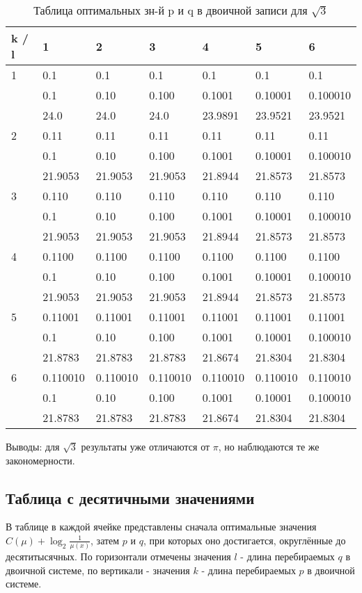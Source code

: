 \documentclass[12pt]{article}
\begin{document}
	\begin{table}[h]
		\caption{Таблица оптимальных зн-й p и q в двоичной записи для $\sqrt{3}$}
		\label{table:3Binary}
		\begin{center}
			\begin{tabular}{|l|l|l|l|l|l|l|}
				\hline
				k / l &1 & 2 & 3 & 4 & 5 & 6\\
				\hline
				1 & 0.1& 0.1& 0.1& 0.1& 0.1& 0.1\\
				& 0.1& 0.10& 0.100& 0.1001& 0.10001& 0.100010\\
				& 24.0& 24.0& 24.0& 23.9891& 23.9521& 23.9521\\
				\hline
				2 & 0.11& 0.11& 0.11& 0.11& 0.11& 0.11\\
				& 0.1& 0.10& 0.100& 0.1001& 0.10001& 0.100010\\
				& 21.9053& 21.9053& 21.9053& 21.8944& 21.8573& 21.8573\\
				\hline
				3 & 0.110& 0.110& 0.110& 0.110& 0.110& 0.110\\
				& 0.1& 0.10& 0.100& 0.1001& 0.10001& 0.100010\\
				& 21.9053& 21.9053& 21.9053& 21.8944& 21.8573& 21.8573\\
				\hline
				4 & 0.1100& 0.1100& 0.1100& 0.1100& 0.1100& 0.1100\\
				& 0.1& 0.10& 0.100& 0.1001& 0.10001& 0.100010\\
				& 21.9053& 21.9053& 21.9053& 21.8944& 21.8573& 21.8573\\
				\hline
				5 & 0.11001& 0.11001& 0.11001& 0.11001& 0.11001& 0.11001\\
				& 0.1& 0.10& 0.100& 0.1001& 0.10001& 0.100010\\
				& 21.8783& 21.8783& 21.8783& 21.8674& 21.8304& 21.8304\\
				\hline
				6 & 0.110010& 0.110010& 0.110010& 0.110010& 0.110010& 0.110010\\
				& 0.1& 0.10& 0.100& 0.1001& 0.10001& 0.100010\\
				& 21.8783& 21.8783& 21.8783& 21.8674& 21.8304& 21.8304\\
				\hline
			\end{tabular}
		\end{center}
	\end{table}
	
	Выводы: для $\sqrt{3}$ результаты уже отличаются от $\pi$, но наблюдаются те же закономерности.
	
	\subsection*{Таблица с десятичными значениями}
	В таблице в каждой ячейке представлены сначала оптимальные значения $C(\mu)+\log_2{\frac{1}{\mu(x)}}$, затем $p$ и $q$, при которых оно достигается, округлённые до десятитысячных. По горизонтали отмечены значения $l$ - длина перебираемых $q$  в двоичной системе, по вертикали - значения $k$ - длина перебираемых $p$  в двоичной системе.
	
\end{document}
